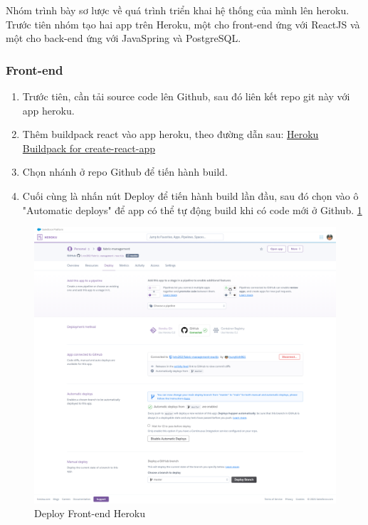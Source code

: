 Nhóm trình bày sơ lược về quá trình triển khai hệ thống của mình lên heroku. Trước tiên nhóm tạo hai app trên Heroku, một cho front-end ứng với ReactJS và một cho back-end ứng với JavaSpring và PostgreSQL.

\subsubsection{Front-end}
\begin{enumerate}
    \item Trước tiên, cần tải source code lên Github, sau đó liên kết repo git này với app heroku.
    \item Thêm buildpack react vào app heroku, theo đường dẫn sau: \href{https://github.com/mars/create-react-app-buildpack}{Heroku Buildpack for create-react-app}
    \item Chọn nhánh ở repo Github để tiến hành build.
    \item Cuối cùng là nhấn nút Deploy để tiến hành build lần đầu, sau đó chọn vào ô "Automatic deploys" để app có thể tự động build khi có code mới ở Github. \ref{deploy_front_end}
\end{enumerate}

\begin{figure}[H]
    \begin{center}
        \includegraphics[width=14cm]{Image/Technical/deploy-front-end.png}
        \caption{Deploy Front-end Heroku}
        \label{deploy_front_end}
    \end{center}
\end{figure}


